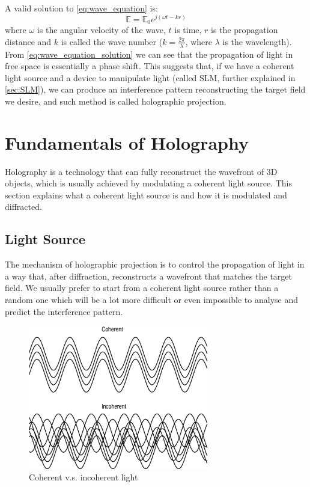 A valid solution to \cref{eq:wave_equation} is:
\begin{equation}
  \mathbb{E} = \mathbb{E}_0 e^{j(\omega t - k r)} \label{eq:wave_equation_solution}
\end{equation}
where $\omega$ is the angular velocity of the wave, $t$ is time, $r$ is the propagation distance and $k$ is called the wave number ($k=\frac{2\pi}{\lambda}$, where $\lambda$ is the wavelength). From \cref{eq:wave_equation_solution} we can see that the propagation of light in free space is essentially a phase shift. This suggests that, if we have a coherent light source and a device to manipulate light (called SLM, further explained in \cref{sec:SLM}), we can produce an interference pattern reconstructing the target field we desire, and such method is called holographic projection.



\section{Fundamentals of Holography}
Holography is a technology that can fully reconstruct the wavefront of 3D objects, which is usually achieved by modulating a coherent light source. This section explains what a coherent light source is and how it is modulated and diffracted.

\subsection{Light Source} \label{sec:Light Source}

The mechanism of holographic projection is to control the propagation of light in a way that, after diffraction, reconstructs a wavefront that matches the target field. We usually prefer to start from a coherent light source rather than a random one which will be a lot more difficult or even impossible to analyse and predict the interference pattern.

\begin{figure}[H]
	\centering
	\includegraphics[width=0.7\textwidth]{coherent-vs-incoherent.eps}
	\caption{Coherent v.s. incoherent light}
	\label{fig:coherent-vs-incoherent.eps}
\end{figure}

